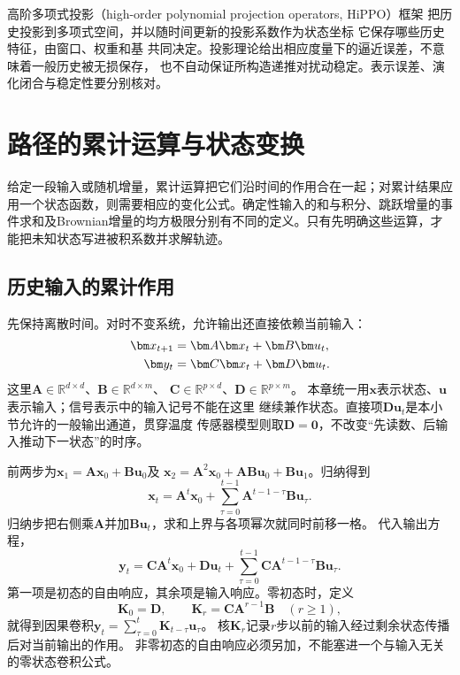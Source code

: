 高阶多项式投影（high-order polynomial projection operators, HiPPO）框架
把历史投影到多项式空间，并以随时间更新的投影系数作为状态坐标
它保存哪些历史特征，由窗口、权重和基
共同决定。投影理论给出相应度量下的逼近误差，不意味着一般历史被无损保存，
也不自动保证所构造递推对扰动稳定。表示误差、演化闭合与稳定性要分别核对。

\section{路径的累计运算与状态变换}
\label{sec:action-state-path-operations}
\label{sec:action-state-random-integrals}
给定一段输入或随机增量，累计运算把它们沿时间的作用合在一起；对累计结果应用一个状态函数，则需要相应的变化公式。确定性输入的和与积分、跳跃增量的事件求和及Brownian增量的均方极限分别有不同的定义。只有先明确这些运算，才能把未知状态写进被积系数并求解轨迹。

\subsection{历史输入的累计作用}
\label{sec:signal-analysis-state-history-kernels}

先保持离散时间。对时不变系统，允许输出还直接依赖当前输入：
\begin{align}
  \bm x_{t+1}&=\bm A\bm x_t+\bm B\bm u_t,\notag\\
  \bm y_t&=\bm C\bm x_t+\bm D\bm u_t.
  \label{eq:signal-analysis-lti-state-space}
\end{align}
这里$\bm A\in\mathbb R^{d\times d}$、$\bm B\in\mathbb R^{d\times m}$、
$\bm C\in\mathbb R^{p\times d}$、$\bm D\in\mathbb R^{p\times m}$。
本章统一用$\bm x$表示状态、$\bm u$表示输入；信号表示中的输入记号不能在这里
继续兼作状态。直接项$\bm D\bm u_t$是本小节允许的一般输出通道，贯穿温度
传感器模型则取$\bm D=\bm0$，不改变“先读数、后输入推动下一状态”的时序。

前两步为$\bm x_1=\bm A\bm x_0+\bm B\bm u_0$及
$\bm x_2=\bm A^2\bm x_0+\bm A\bm B\bm u_0+\bm B\bm u_1$。归纳得到
\begin{equation}
  \bm x_t=\bm A^t\bm x_0+
    \sum_{\tau=0}^{t-1}\bm A^{t-1-\tau}\bm B\bm u_\tau.
  \label{eq:signal-analysis-state-unrolling}
\end{equation}
归纳步把右侧乘$\bm A$并加$\bm B\bm u_t$，求和上界与各项幂次就同时前移一格。
代入输出方程，
\begin{equation}
  \bm y_t=\bm C\bm A^t\bm x_0+\bm D\bm u_t+
    \sum_{\tau=0}^{t-1}\bm C\bm A^{t-1-\tau}\bm B\bm u_\tau.
  \label{eq:signal-analysis-state-convolution}
\end{equation}
第一项是初态的自由响应，其余项是输入响应。零初态时，定义
\begin{equation}
  \bm K_0=\bm D,\qquad
  \bm K_r=\bm C\bm A^{r-1}\bm B\quad(r\geq1),
  \label{eq:signal-analysis-state-kernel}
\end{equation}
就得到因果卷积$\bm y_t=\sum_{\tau=0}^t\bm K_{t-\tau}\bm u_\tau$。
核$\bm K_r$记录$r$步以前的输入经过剩余状态传播后对当前输出的作用。
非零初态的自由响应必须另加，不能塞进一个与输入无关的零状态卷积公式。

